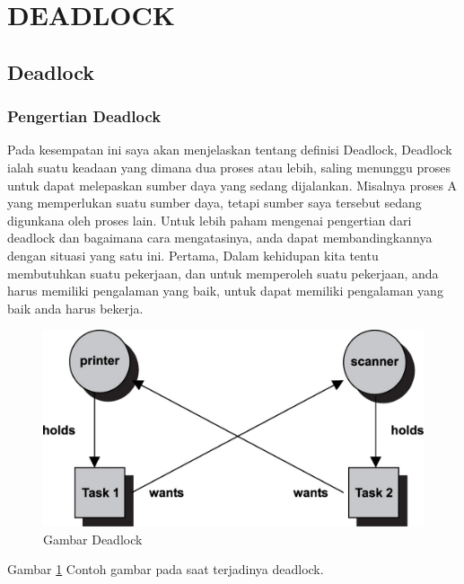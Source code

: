 
\section {DEADLOCK}

\subsection {Deadlock}
\subsubsection {Pengertian Deadlock}
	Pada kesempatan ini saya akan menjelaskan tentang definisi Deadlock, Deadlock ialah suatu keadaan yang dimana dua proses atau lebih, saling menunggu proses untuk dapat melepaskan sumber daya yang sedang dijalankan. Misalnya proses A yang memperlukan suatu sumber daya, tetapi sumber saya tersebut sedang digunkana oleh proses lain. Untuk lebih paham mengenai pengertian dari deadlock dan bagaimana cara mengatasinya, anda dapat membandingkannya dengan situasi yang satu ini. Pertama, Dalam kehidupan kita tentu membutuhkan suatu pekerjaan, dan untuk memperoleh suatu pekerjaan, anda harus memiliki pengalaman yang baik, untuk dapat memiliki pengalaman yang baik anda harus bekerja.

	\begin{figure}[ht]
	\centerline{\includegraphics[width=1\textwidth]{figures/deadlock1.jpg}}
	\caption{Gambar Deadlock}
	\label{Gambar}
	\end{figure}
      
      Gambar \ref{Gambar} Contoh gambar pada saat terjadinya deadlock.

